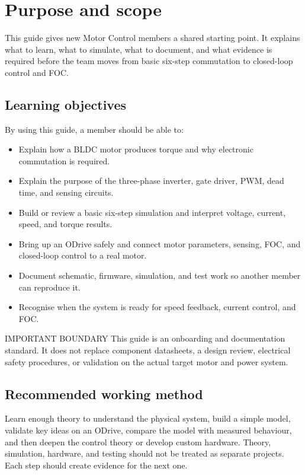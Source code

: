 \documentclass[11pt,a4paper]{article}
\begin{document}
\section{Purpose and scope}

This guide gives new Motor Control members a shared starting point. It
explains what to learn, what to simulate, what to document, and what evidence
is required before the team moves from basic six-step commutation to
closed-loop control and FOC.

\subsection{Learning objectives}

By using this guide, a member should be able to:

\begin{itemize}
  \item Explain how a BLDC motor produces torque and why electronic commutation is required.
  \item Explain the purpose of the three-phase inverter, gate driver, PWM, dead time, and sensing circuits.
  \item Build or review a basic six-step simulation and interpret voltage, current, speed, and torque results.
  \item Bring up an ODrive safely and connect motor parameters, sensing, FOC, and closed-loop control to a real motor.
  \item Document schematic, firmware, simulation, and test work so another member can reproduce it.
  \item Recognise when the system is ready for speed feedback, current control, and FOC.
\end{itemize}

\begin{callout}{IMPORTANT BOUNDARY}
  This guide is an onboarding and documentation standard. It does not replace
  component datasheets, a design review, electrical safety procedures, or
  validation on the actual target motor and power system.
\end{callout}

\subsection{Recommended working method}

Learn enough theory to understand the physical system, build a simple model,
validate key ideas on an ODrive, compare the model with measured behaviour,
and then deepen the control theory or develop custom hardware. Theory,
simulation, hardware, and testing should not be treated as separate projects.
Each step should create evidence for the next one.
\end{document}
